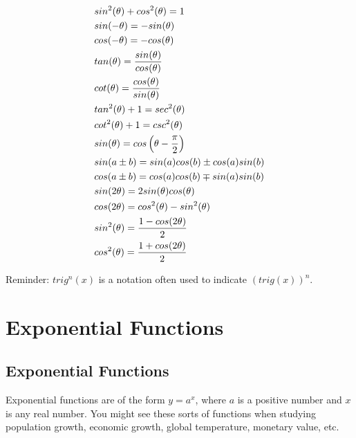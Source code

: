 \begin{theorem}
	\begin{align}
		 & sin^2(\theta) + cos^2(\theta) = 1                    \\
		 & sin(-\theta) = -sin(\theta)                          \\
		 & cos(-\theta) = -cos(\theta)                          \\
		 & tan(\theta) = {sin(\theta) \over cos(\theta)}        \\
		 & cot(\theta) = {cos(\theta) \over sin(\theta)}        \\
		 & tan^2(\theta) + 1 = sec^2(\theta)                    \\
		 & cot^2(\theta) + 1 = csc^2(\theta)                    \\
		 & sin(\theta) = cos\left(\theta - {\pi \over 2}\right) \\
		 & sin(a \pm b) = sin(a)cos(b) \pm cos(a)sin(b)         \\
		 & cos(a \pm b) = cos(a)cos(b) \mp sin(a)sin(b)         \\
		 & sin(2\theta) = 2sin(\theta)cos(\theta)               \\
		 & cos(2\theta) = cos^2(\theta) - sin^2(\theta)         \\
		 & sin^2(\theta) = {1 - cos(2\theta) \over 2}           \\
		 & cos^2(\theta) = {1 + cos(2\theta) \over 2}
	\end{align}
\end{theorem}

Reminder: $ trig^n(x) $ is a notation often used to indicate $ (trig(x))^n $. \\

\chapter{Exponential Functions}

\section{Exponential Functions}

Exponential functions are of the form $ y = a^x $, where $ a $ is a positive number and $ x $ is any real number. You might see these sorts of functions when studying population growth, economic growth, global temperature, monetary value, etc. \\

